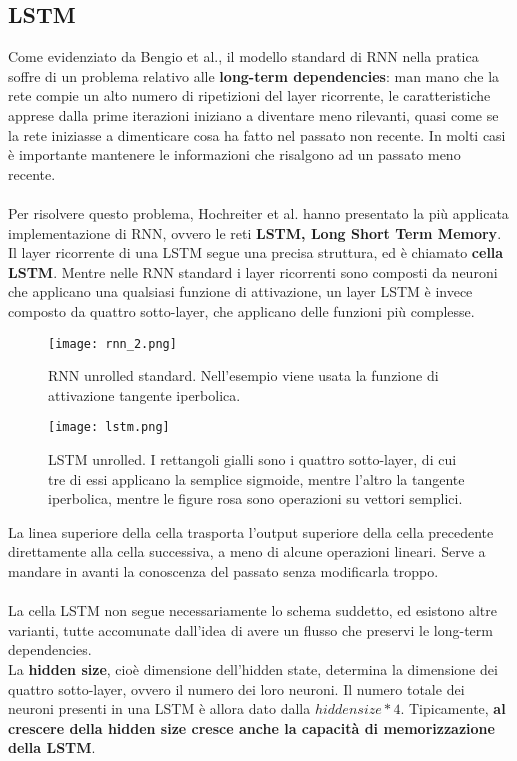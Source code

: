 \subsection{LSTM}
Come evidenziato da Bengio et al.\cite{long_term}, il modello standard di RNN nella pratica soffre di un problema relativo alle \textbf{long-term dependencies}: man mano che la rete compie un alto numero di ripetizioni del layer ricorrente, le caratteristiche apprese dalla prime iterazioni iniziano a diventare meno rilevanti, quasi come se la rete iniziasse a dimenticare cosa ha fatto nel passato non recente. In molti casi è importante mantenere le informazioni che risalgono ad un passato meno recente.\\
\\
Per risolvere questo problema, Hochreiter et al.\cite{lstm} hanno presentato la più applicata implementazione di RNN, ovvero le reti \textbf{LSTM, Long Short Term Memory}.\\
Il layer ricorrente di una LSTM segue una precisa struttura, ed è chiamato \textbf{cella LSTM}. Mentre nelle RNN standard i layer ricorrenti sono composti da neuroni che applicano una qualsiasi funzione di attivazione, un layer LSTM è invece composto da quattro sotto-layer, che applicano delle funzioni più complesse.
\begin{figure}[H]
	\centering
	\texttt{[image: rnn\_2.png]}
	\caption{RNN unrolled standard. Nell'esempio viene usata la funzione di attivazione tangente iperbolica.}
	\label{fig:rnn_2}
\end{figure}
\begin{figure}[H]
	\centering
	\texttt{[image: lstm.png]}
	\caption{LSTM unrolled. I rettangoli gialli sono i quattro sotto-layer, di cui tre di essi applicano la semplice sigmoide, mentre l'altro la tangente iperbolica, mentre le figure rosa sono operazioni su vettori semplici.}
	\label{fig:lstm}
\end{figure}

La linea superiore della cella trasporta l'output superiore della cella precedente direttamente alla cella successiva, a meno di alcune operazioni lineari. Serve a mandare in avanti la conoscenza del passato senza modificarla troppo.\\
\\
La cella LSTM non segue necessariamente lo schema suddetto, ed esistono altre varianti, tutte accomunate dall'idea di avere un flusso che preservi le long-term dependencies.\\
La \textbf{hidden size}, cioè dimensione dell'hidden state, determina la dimensione dei quattro sotto-layer, ovvero il numero dei loro neuroni. Il numero totale dei neuroni presenti in una LSTM è allora dato dalla $hidden size * 4$. Tipicamente, \textbf{al crescere della hidden size cresce anche la capacità di memorizzazione della LSTM}.

